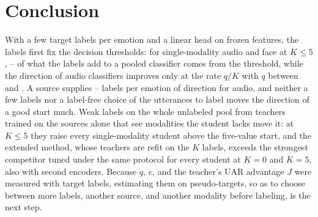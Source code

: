 \section{Conclusion}
\label{sec:conclusion}

With a few target labels per emotion and a linear head on frozen features, the labels first fix the decision thresholds: for single-modality audio and face at $K \le 5$, -- of what the labels add to a pooled classifier comes from the threshold, while the direction of audio classifiers improves only at the rate $q/K$ with $q$ between  and .
A source supplies -- labels per emotion of direction for audio, and neither a few labels nor a label-free choice of the utterances to label moves the direction of a good start much.
Weak labels on the whole unlabeled pool from teachers trained on the sources alone that see modalities the student lacks move it: at $K \le 5$ they raise every single-modality student above the five-value start, and the extended method, whose teachers are refit on the $K$ labels, exceeds the strongest competitor tuned under the same protocol for every student at $K=0$ and $K=5$, also with second encoders.
Because $q$, $e$, and the teacher's UAR advantage $J$ were measured with target labels, estimating them on pseudo-targets, so as to choose between more labels, another source, and another modality before labeling, is the next step.
